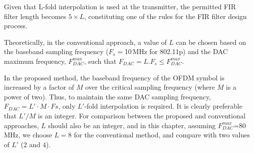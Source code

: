Given that L-fold interpolation is used at the transmitter, the permitted FIR filter length becomes $5 \times L$, constituting one of the rules for the FIR filter design process.

Theoretically, in the conventional approach, a value of $L$ can be chosen based on the baseband sampling frequency ($F_s=$10\,MHz for 802.11p) and the DAC maximum frequency, $F_{DAC}^{max}$, such that $F_{DAC}=L.F_s \le F_{DAC}^{max}$.

In the proposed method, the baseband frequency of the OFDM symbol is increased by a factor of $M$ over the critical sampling frequency (where $M$ is a power of two). Thus, to maintain the same DAC sampling frequency, $F_{DAC}=L'\cdot M\cdot Fs$, only $L'$-fold interpolation is required.
It is clearly preferable that $L'/M$ is an integer.
For comparison between the proposed and conventional approaches, $L$ should also be an integer, and in this chapter, assuming $F_{DAC}^{max}$=80\,MHz, we choose $L=8$ for the conventional method, and compare with two values of $L'$ ($2$ and $4$).

